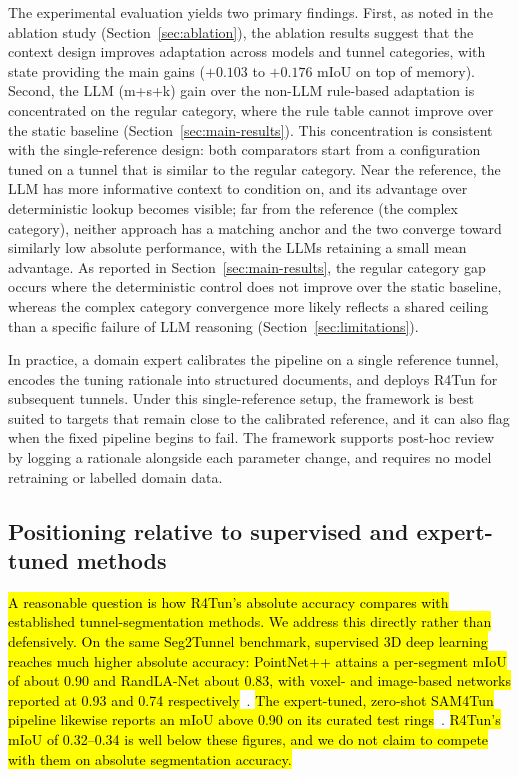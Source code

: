\documentclass[a4paper,fleqn]{cas-dc}
\newcommand{\hlcite}[1]{\hl{\cite{#1}}}
\begin{document}
{The experimental evaluation yields two primary findings. First, as noted in the ablation study (Section~\ref{sec:ablation}), the ablation results suggest that the context design improves adaptation across models and tunnel categories, with state providing the main gains ($+0.103$ to $+0.176$ mIoU on top of memory). Second, the LLM (m+s+k) gain over the non-LLM rule-based adaptation is concentrated on the regular category, where the rule table cannot improve over the static baseline (Section~\ref{sec:main-results}). This concentration is consistent with the single-reference design: both comparators start from a configuration tuned on a tunnel that is similar to the regular category. Near the reference, the LLM has more informative context to condition on, and its advantage over deterministic lookup becomes visible; far from the reference (the complex category), neither approach has a matching anchor and the two converge toward similarly low absolute performance, with the LLMs retaining a small mean advantage. As reported in Section~\ref{sec:main-results}, the regular category gap occurs where the deterministic control does not improve over the static baseline, whereas the complex category convergence more likely reflects a shared ceiling than a specific failure of LLM reasoning (Section~\ref{sec:limitations}).


In practice, a domain expert calibrates the pipeline on a single reference tunnel, encodes the tuning rationale into structured documents, and deploys R4Tun for subsequent tunnels. Under this single-reference setup, the framework is best suited to targets that remain close to the calibrated reference, and it can also flag when the fixed pipeline begins to fail. The framework supports post-hoc review by logging a rationale alongside each parameter change, and requires no model retraining or labelled domain data.


\subsection{Positioning relative to supervised and expert-tuned methods}\label{sec:positioning}

\hl{A reasonable question is how R4Tun's absolute accuracy compares with established tunnel-segmentation methods. We address this directly rather than defensively. On the same Seg2Tunnel benchmark, supervised 3D deep learning reaches much higher absolute accuracy: PointNet++ attains a per-segment mIoU of about 0.90 and RandLA-Net about 0.83, with voxel- and image-based networks reported at 0.93 and 0.74 respectively}~\hlcite{lin2024seg2tunnel}. \hl{The expert-tuned, zero-shot SAM4Tun pipeline likewise reports an mIoU above 0.90 on its curated test rings}~\hlcite{ye2025sam4tun}. \hl{R4Tun's mIoU of 0.32--0.34 is well below these figures, and we do not claim to compete with them on absolute segmentation accuracy.}

}
\end{document}
